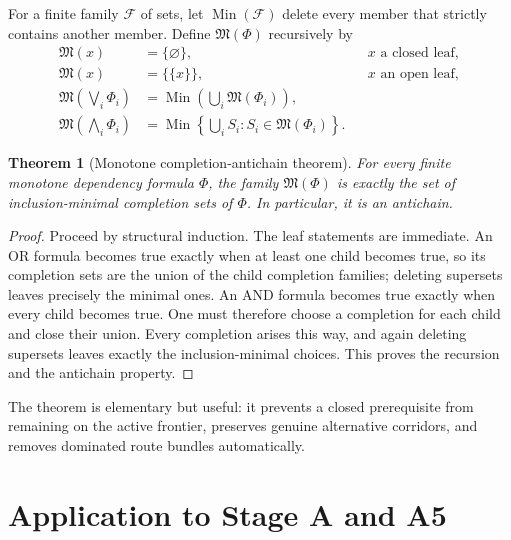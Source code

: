 \documentclass[11pt]{article}
\newtheorem{theorem}{Theorem}[section]
\theoremstyle{definition}
\theoremstyle{remark}
\newcommand{\M}{\mathfrak M}
\begin{document}
For a finite family $\mathcal F$ of sets, let
$\operatorname{Min}(\mathcal F)$ delete every member that strictly contains
another member.  Define $\M(\Phi)$ recursively by
\begin{align*}
 \M(x)&=\{\varnothing\}, &&x\text{ a closed leaf},\\
 \M(x)&=\{\{x\}\}, &&x\text{ an open leaf},\\
 \M\!\left(\bigvee_i\Phi_i\right)
 &=\operatorname{Min}\!\left(\bigcup_i\M(\Phi_i)\right),\\
 \M\!\left(\bigwedge_i\Phi_i\right)
 &=\operatorname{Min}\!\left\{
     \bigcup_i S_i:S_i\in\M(\Phi_i)\right\}.
\end{align*}

\begin{theorem}[Monotone completion-antichain theorem]
\label{thm:completion}
For every finite monotone dependency formula $\Phi$, the family
$\M(\Phi)$ is exactly the set of inclusion-minimal completion sets of
$\Phi$.  In particular, it is an antichain.
\end{theorem}

\begin{proof}
Proceed by structural induction.  The leaf statements are immediate.  An OR
formula becomes true exactly when at least one child becomes true, so its
completion sets are the union of the child completion families; deleting
supersets leaves precisely the minimal ones.  An AND formula becomes true
exactly when every child becomes true.  One must therefore choose a completion
for each child and close their union.  Every completion arises this way, and
again deleting supersets leaves exactly the inclusion-minimal choices.  This
proves the recursion and the antichain property.
\end{proof}

The theorem is elementary but useful: it prevents a closed prerequisite from
remaining on the active frontier, preserves genuine alternative corridors,
and removes dominated route bundles automatically.

\section{Application to Stage A and A5}
\end{document}
